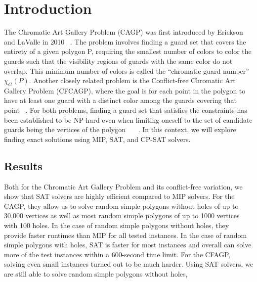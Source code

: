 \chapter{Introduction}
The Chromatic Art Gallery Problem (CAGP) was first introduced by Erickson and LaValle in 2010 ~\cite{erickson2010chromatic}. The problem involves finding a guard set that covers the entirety of a given polygon P, requiring the smallest number of colors to color the guards such that the visibility regions of guards with the same color do not overlap. This minimum number of colors is called the ``chromatic guard number'' $\chi_G(P)$. Another closely related problem is the Conflict-free Chromatic Art Gallery Problem (CFCAGP), where the goal is for each point in the polygon to have at least one guard with a distinct color among the guards covering that point ~\cite{bartschi2014conflict}. For both problems, finding a guard set that satisfies the constraints has been established to be NP-hard even when limiting oneself to the set of candidate guards being the vertices of the polygon ~\cite{fekete2014chromatic}~\cite{erickson2011many}~\cite{iwamoto2022vertex}. In this context, we will explore finding exact solutions using MIP, SAT, and CP-SAT solvers.

\section{Results}
Both for the Chromatic Art Gallery Problem and its conflict-free variation, we show that SAT solvers are highly efficient compared to MIP solvers. For the CAGP, they allow us to solve random simple polygons without holes of up to 30,000 vertices as well as most random simple polygons of up to 1000 vertices with 100 holes. In the case of random simple polygons without holes, they provide faster runtimes than MIP for all tested instances. In the case of random simple polygons with holes, SAT is faster for most instances and overall can solve more of the test instances within a 600-second time limit.
For the CFAGP, solving even small instances turned out to be much harder. Using SAT solvers, we are still able to solve random simple polygons without holes, 

